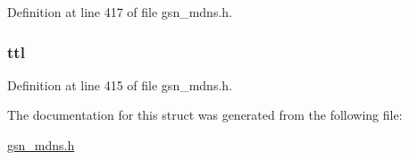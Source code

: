 Definition at line 417 of file gsn\_\-mdns.h.

\hypertarget{a00143_af96204bb13dce2fe8a0dac78b29c40a4}{
\subsubsection[{ttl}]{ {\bf ttl}}}
\label{a00143_af96204bb13dce2fe8a0dac78b29c40a4}


Definition at line 415 of file gsn\_\-mdns.h.



The documentation for this struct was generated from the following file:\begin{DoxyCompactItemize}
\item 
\hyperlink{a00526}{gsn\_\-mdns.h}\end{DoxyCompactItemize}
